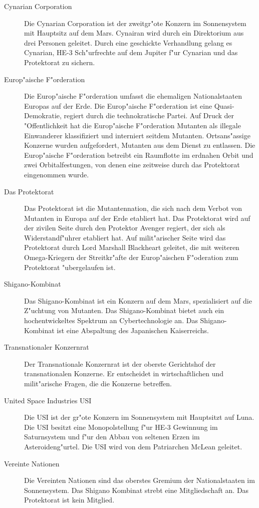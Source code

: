 
\begin{description}
\item [Cynarian Corporation] Die Cynarian Corporation ist der zweitgr"o\3te Konzern im Sonnensystem mit Hauptsitz auf
      dem Mars. Cynairan wird durch ein Direktorium aus drei Personen geleitet. Durch eine geschickte Verhandlung gelang es Cynarian, HE-3 Sch"urfrechte auf dem Jupiter f"ur Cynarian und das Protektorat zu sichern.
      \item [Europ"aische F"orderation] Die Europ"aische F"orderation umfasst die ehemaligen Nationalstaaten Europas auf der Erde. Die Europ"aische F"orderation ist eine Quasi-Demokratie, regiert durch die technokratische Partei. Auf Druck der "Offentlichkeit hat die Europ"aische F"orderation Mutanten als illegale Einwanderer klassifiziert und interniert seitdem Mutanten. Ortsans"assige Konzerne wurden aufgefordert, Mutanten aus dem Dienst zu entlassen. Die Europ"aische F"orderation betreibt ein Raumflotte im erdnahen Orbit und zwei Orbitalfestungen, von denen eine zeitweise durch das Protektorat eingenommen wurde.
\item [Das Protektorat] Das Protektorat ist die Mutantennation, die sich nach dem Verbot von Mutanten in Europa
      auf der Erde etabliert hat. Das Protektorat wird auf der zivilen Seite durch den Protektor Avenger regiert, der sich als Widerstandf"uhrer etabliert hat. Auf milit"arischer Seite wird das Protektorat durch Lord Marshall Blackheart geleitet, die mit weiteren Omega-Kriegern der Streitkr"afte der Europ"aischen F"oderation zum Protektorat "ubergelaufen ist.
\item [Shigano-Kombinat] Das Shigano-Kombinat ist ein Konzern auf dem Mars, spezialisiert auf die Z"uchtung von
      Mutanten. Das Shigano-Kombinat bietet auch ein hochentwickeltes Spektrum an Cybertechnologie an. Das Shigano-Kombinat ist eine Abspaltung des Japanischen Kaiserreichs.
\item [Transnationaler Konzernrat] Der Transnationale Konzernrat ist der oberste Gerichtshof der transnationalen
      Konzerne. Er entscheidet in wirtschaftlichen und milit"arische Fragen, die die Konzerne betreffen.
\item [United Space Industries USI] Die USI ist der gr"o\3te Konzern im Sonnensystem mit Hauptsitzt auf Luna. Die USI
      besitzt eine Monopolstellung f"ur HE-3 Gewinnung im Saturnsystem und f"ur den Abbau von seltenen Erzen im Asteroideng"urtel. Die USI wird von dem Patriarchen McLean geleitet.
\item [Vereinte Nationen] Die Vereinten Nationen sind das oberstes Gremium der Nationalstaaten im Sonnensystem. Das
      Shigano Kombinat strebt eine Mitgliedschaft an. Das Protektorat ist kein Mitglied.
\end{description}

